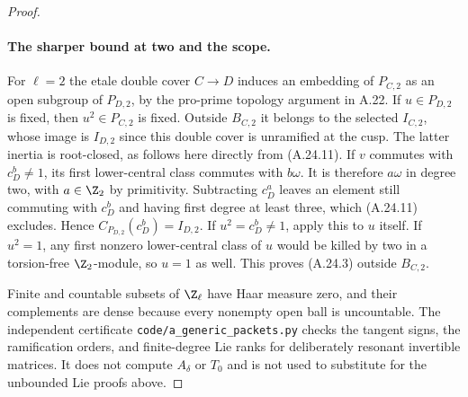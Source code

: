 \begin{proof}
\paragraph{The sharper bound at two and the scope.}
For $\ell=2$ the etale double cover $C\to D$ induces an
embedding of $P_{C,2}$ as an open subgroup of $P_{D,2}$,
by the pro-prime topology argument in A.22.
If $u\in P_{D,2}$ is fixed, then $u^2\in P_{C,2}$ is
fixed. Outside $B_{C,2}$ it belongs to the selected
$I_{C,2}$, whose image is $I_{D,2}$ since this double
cover is unramified at the cusp.
The latter inertia is root-closed, as follows here
directly from (A.24.11). If $v$ commutes with
$c_D^b\ne1$, its first lower-central class commutes with
$b\omega$. It is therefore $a\omega$ in degree two,
with $a\in\Z_2$ by primitivity. Subtracting $c_D^a$
leaves an element still commuting with $c_D^b$ and
having first degree at least three, which (A.24.11)
excludes. Hence $C_{P_{D,2}}(c_D^b)=I_{D,2}$.
If $u^2=c_D^b\ne1$, apply this to $u$ itself.
If $u^2=1$, any first nonzero lower-central class of
$u$ would be killed by two in a torsion-free
$\Z_2$-module, so $u=1$ as well.
This proves (A.24.3) outside $B_{C,2}$.

Finite and countable subsets of $\Z_\ell$ have Haar
measure zero, and their complements are dense because
every nonempty open ball is uncountable.
The independent certificate
\texttt{code/a\_generic\_packets.py} checks the tangent
signs, the ramification orders, and finite-degree Lie
ranks for deliberately resonant invertible matrices.
It does not compute $A_\delta$ or $T_0$ and is not used
to substitute for the unbounded Lie proofs above.
\end{proof}
